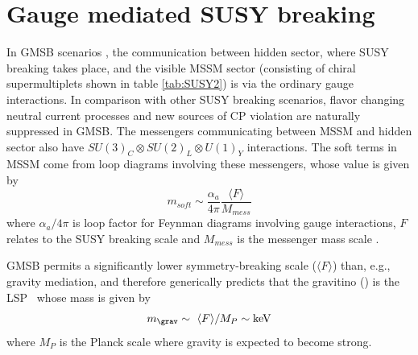 \section{Gauge mediated SUSY breaking}
\label{sec:gmsb}
In GMSB scenarios \cite{Dine:1993yw,Dine:1994vc,Dine:1995ag,Meade:2008wd,Giudice:1998bp,Grajek:2013ola}, the communication between hidden 
sector, where SUSY breaking takes place, and the visible MSSM sector (consisting of chiral supermultiplets shown in table \ref{tab:SUSY2}) 
is via the ordinary gauge interactions. In comparison with other SUSY breaking scenarios, flavor changing neutral current processes and new sources of CP 
violation are naturally suppressed \cite{Dine:1993yw} in GMSB. The messengers communicating between MSSM and hidden sector also have 
$SU(3)_C \otimes SU(2)_L \otimes U(1)_Y$ interactions. The soft terms in MSSM come from loop diagrams involving these messengers, whose 
value is given by
\begin{equation}
m_{soft} \sim \frac{\alpha_{a}}{4\pi} \frac{\langle F \rangle}{M_{mess}}
\end{equation}
where $\alpha_{a}/{4\pi}$ is loop factor for Feynman diagrams involving gauge interactions, $F$ relates to the SUSY breaking scale and 
$M_{mess}$ is the messenger mass scale \cite{Martin:1997ns}.

GMSB permits a significantly lower symmetry-breaking scale ($\langle F\rangle$) than, e.g., gravity mediation, and therefore generically 
predicts that the gravitino () is the LSP~\cite{Meade:2008wd,PhysRevLett.38.1433,CREMMER1978231} whose mass is given by
\begin{equation}
\label{massGrav}
m_{\grav}  \sim \ \langle F \rangle/M_P \sim \mathrm{keV}
\end{equation}
where $M_P$ is the Planck scale where gravity is expected to become strong.

